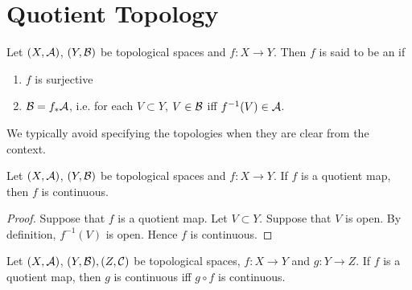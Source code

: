 \documentclass{book}
\begin{document}
	
	
	
	
	
	
	
	
	
	
	
	
	
	
	
	
	
	
	
	
	
	
	
	
	
	
	
	
	
	
	
	
	\newpage
	\section{Quotient Topology}
	
	\begin{defn} 
	Let $(X, \mathcal{A})$, $(Y, \mathcal{B})$ be topological spaces and $f:X \rightarrow Y$. Then $f$ is said to be an  if 
	\begin{enumerate}
	\item $f$ is surjective
	\item $\mathcal{B} = f_*\mathcal{A}$, i.e. for each $V \subset Y$, $V \in \mathcal{B}$ iff $f^{-1}(V) \in \mathcal{A}$.
	\end{enumerate}
	\end{defn}
	
	\begin{note}
	We typically avoid specifying the topologies when they are clear from the context.
	\end{note}
	
	\begin{ex} 
	Let $(X, \mathcal{A})$, $(Y, \mathcal{B})$ be topological spaces and $f:X \rightarrow Y$. If $f$ is a quotient map, then $f$ is continuous.
	\end{ex}
	
	\begin{proof}
	Suppose that $f$ is a quotient map. Let $V \subset Y$. Suppose that $V$ is open. By definition, $f^{-1}(V)$ is open. Hence $f$ is continuous.  
	\end{proof}

	\begin{ex}
		Let $(X, \mathcal{A})$, $(Y, \mathcal{B}), (Z, \mathcal{C})$ be topological spaces, $f:X \rightarrow Y$ and $g: Y \rightarrow Z$. If $f$ is a quotient map, then $g$ is continuous iff $g \circ f$ is continuous.
	\end{ex}
	
\end{document}
